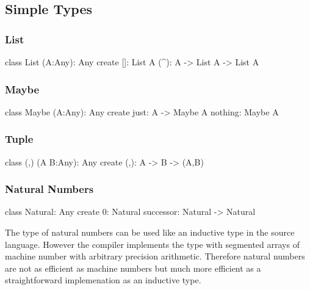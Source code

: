 \subsection{Simple Types}
\label{sec:simple-types}



\subsubsection{List}

\begin{alba}
  class
    List (A:Any): Any
  create
    []: List A
    (^): A -> List A -> List A
\end{alba}
\vskip 2mm




\subsubsection{Maybe}

\begin{alba}
  class
    Maybe (A:Any): Any
  create
    just:    A -> Maybe A
    nothing: Maybe A
\end{alba}
\vskip 2mm


\subsubsection{Tuple}

\begin{alba}
  class
    (,) (A B:Any): Any
  create
    (,):    A -> B -> (A,B)
\end{alba}
\vskip 2mm




\subsubsection{Natural Numbers}

\begin{alba}
  class
    Natural: Any
  create
    0: Natural
    successor: Natural -> Natural
\end{alba}

The type of natural numbers can be used like an inductive type in the source
language. However the compiler implements the type with segmented arrays of
machine number with arbitrary precision arithmetic. Therefore natural numbers
are not as efficient as machine numbers but much more efficient as a
straightforward implemenation as an inductive type.


